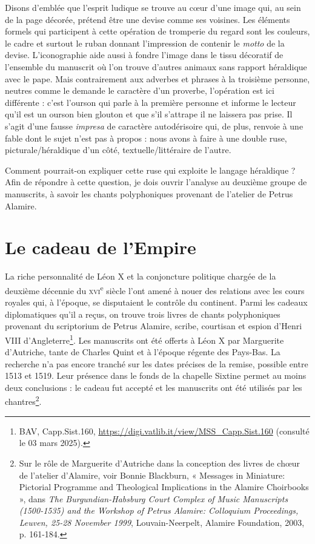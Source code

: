 \documentclass[12pt,twoside,openany]{book}
\begin{document}
Disons d’emblée que l’esprit ludique se trouve au cœur d’une image qui, au sein de la page décorée, prétend être une devise comme ses voisines. Les éléments formels qui participent à cette opération de tromperie du regard sont les couleurs, le cadre et surtout le ruban donnant l’impression de contenir le \textit{motto} de la devise. L’iconographie aide aussi à fondre l’image dans le tissu décoratif de l’ensemble du manuscrit où l’on trouve d’autres animaux sans rapport héraldique avec le pape. Mais contrairement aux adverbes et phrases à la troisième personne, neutres comme le demande le caractère d’un proverbe, l’opération est ici différente : c’est l’ourson qui parle à la première personne et informe le lecteur qu’il est un ourson bien glouton et que s’il s’attrape il ne laissera pas prise. Il s’agit d’une fausse \textit{impresa} de caractère autodérisoire qui, de plus, renvoie à une fable dont le sujet n’est pas à propos : nous avons à faire à une double ruse, picturale/héraldique d’un côté, textuelle/littéraire de l’autre.

Comment pourrait-on expliquer cette ruse qui exploite le langage héraldique ? Afin de répondre à cette question, je dois ouvrir l’analyse au deuxième groupe de manuscrits, à savoir les chants polyphoniques provenant de l’atelier de Petrus Alamire.

\section{Le cadeau de l’Empire}

La riche personnalité de Léon X et la conjoncture politique chargée de la deuxième décennie du \textsc{xvi}\textsuperscript{e} siècle l’ont amené à nouer des relations avec les cours royales qui, à l’époque, se disputaient le contrôle du continent. Parmi les cadeaux diplomatiques qu’il a reçus, on trouve trois livres de chants polyphoniques provenant du scriptorium de Petrus Alamire, scribe, courtisan et espion d’Henri VIII d’Angleterre\footnote{BAV, Capp.Sist.160, \href{https://digi.vatlib.it/view/MSS\_Capp.Sist.160}{https://digi.vatlib.it/view/MSS\_Capp.Sist.160} (consulté le 03 mars 2025).}. Les manuscrits ont été offerts à Léon X par Marguerite d’Autriche, tante de Charles Quint et à l’époque régente des Pays-Bas. La recherche n’a pas encore tranché sur les dates précises de la remise, possible entre 1513 et 1519. Leur présence dans le fonds de la chapelle Sixtine permet au moins deux conclusions : le cadeau fut accepté et les manuscrits ont été utilisés par les chantres\footnote{Sur le rôle de Marguerite d’Autriche dans la conception des livres de chœur de l’atelier d’Alamire, voir Bonnie Blackburn, « Messages in Miniature: Pictorial Programme and Theological Implications in the Alamire Choirbooks », dans \textit{The Burgundian-Habsburg Court Complex of Music Manuscripts (1500-1535) and the Workshop of Petrus Alamire: Colloquium Proceedings, Leuven, 25-28 November 1999}, Louvain-Neerpelt, Alamire Foundation, 2003, p. 161-184.}.
\end{document}
